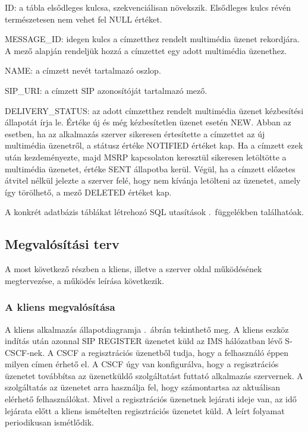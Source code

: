 \begin{mydescription}
\item[ID:] a tábla elsődleges kulcsa, szekvenciálisan növekszik. Elsődleges kulcs révén természetesen nem vehet fel NULL értéket.
\item[MESSAGE\_ID:] idegen kulcs a címzetthez rendelt multimédia üzenet rekordjára. A mező alapján rendeljük hozzá a címzettet egy adott multimédia üzenethez.
\item[NAME:]  a címzett nevét tartalmazó oszlop.
\item[SIP\_URI:] a címzett SIP azonosítóját tartalmazó mező.
\item[DELIVERY\_STATUS:] az adott címzetthez rendelt multimédia üzenet kézbesítési állapotát írja le. Értéke új és még kézbesítetlen üzenet esetén NEW. Abban az esetben, ha az alkalmazás szerver sikeresen értesítette a címzettet az új multimédia üzenetről, a státusz értéke NOTIFIED értéket kap. Ha a címzett ezek után kezdeményezte, majd MSRP kapcsolaton keresztül sikeresen letöltötte a multimédia üzenetet, értéke SENT állapotba kerül. Végül, ha a címzett előzetes átvitel nélkül jelezte a szerver felé, hogy nem kívánja letölteni az üzenetet, amely így törölhető, a mező DELETED értéket kap.
\end{mydescription}

A konkrét adatbázis táblákat létrehozó SQL utasítások .~függelékben találhatóak.

\medskip

\subsection{Megvalósítási terv}
\label{sec:megvalositas}

A most következő részben a kliens, illetve a szerver oldal működésének megtervezése, a működés leírása következik.

\subsubsection{A kliens megvalósítása}
\label{sec:kliensmegvalositas}

A kliens alkalmazás állapotdiagramja .~ábrán tekinthető meg. A kliens eszköz indítás után azonnal SIP REGISTER üzenetet küld az IMS hálózatban lévő S-CSCF-nek. A CSCF a  regisztrációs üzenetből tudja, hogy a felhasználó éppen milyen címen érhető el. A CSCF úgy van konfigurálva, hogy a regisztrációs üzenetet továbbítsa az üzenetküldő szolgáltatást futtató alkalmazás szervernek. A szolgáltatás az üzenetet arra használja fel, hogy számontartsa az aktuálisan elérhető felhasználókat. Mivel a regisztrációs üzenetnek lejárati ideje van, az idő lejárata előtt a kliens ismételten regisztrációs üzenetet küld. A leírt folyamat periodikusan ismétlődik.

